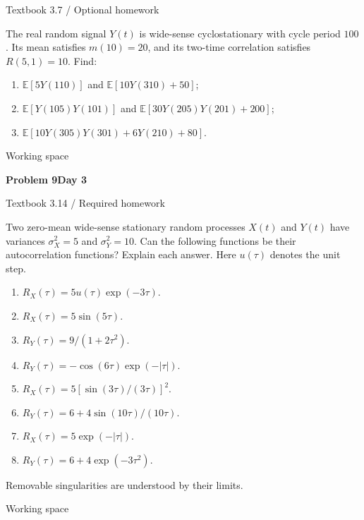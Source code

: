 \documentclass[11pt]{article}
\newcommand{\E}{\mathbb E}\newcommand{\ee}{\mathrm e}\newcommand{\jj}{\mathrm j}
\newcommand{\qtitle}[2]{\clearpage\begin{tcolorbox}[colback=navy,colframe=navy,arc=1.5pt,boxrule=0pt]\color{white}\large\bfseries #1\hfill\small #2\end{tcolorbox}}
\begin{document}
{\small\color{accentred}Textbook 3.7 / Optional homework}\par{}\par{}\par\smallskip\begin{tcolorbox}[colback=qbg,colframe=qbg,boxrule=0pt]The real random signal $Y(t)$ is wide-sense cyclostationary with cycle period $100$. Its mean satisfies $m(10)=20$, and its two-time correlation satisfies $R(5,1)=10$. Find:
\begin{enumerate}
\item $\E[5Y(110)]$ and $\E[10Y(310)+50]$;
\item $\E[Y(105)Y(101)]$ and $\E[30Y(205)Y(201)+200]$;
\item $\E[10Y(305)Y(301)+6Y(210)+80]$.
\end{enumerate}\end{tcolorbox}\smallskip\begin{workspace}\hfill{\color{linec}\footnotesize Working space}\end{workspace}
\qtitle{Problem 9}{Day 3}
{\small\color{accentred}Textbook 3.14 / Required homework}\par{}\par{}\par\smallskip\begin{tcolorbox}[colback=qbg,colframe=qbg,boxrule=0pt]Two zero-mean wide-sense stationary random processes $X(t)$ and $Y(t)$ have variances $\sigma_X^2=5$ and $\sigma_Y^2=10$. Can the following functions be their autocorrelation functions? Explain each answer. Here $u(\tau)$ denotes the unit step.
\begin{enumerate}
\item $R_X(\tau)=5u(\tau)\exp(-3\tau)$.
\item $R_X(\tau)=5\sin(5\tau)$.
\item $R_Y(\tau)=9/(1+2\tau^2)$.
\item $R_Y(\tau)=-\cos(6\tau)\exp(-|\tau|)$.
\item $R_X(\tau)=5[\sin(3\tau)/(3\tau)]^2$.
\item $R_Y(\tau)=6+4\sin(10\tau)/(10\tau)$.
\item $R_X(\tau)=5\exp(-|\tau|)$.
\item $R_Y(\tau)=6+4\exp(-3\tau^2)$.
\end{enumerate}
Removable singularities are understood by their limits.\end{tcolorbox}\smallskip\begin{workspace}\hfill{\color{linec}\footnotesize Working space}\end{workspace}
\end{document}
